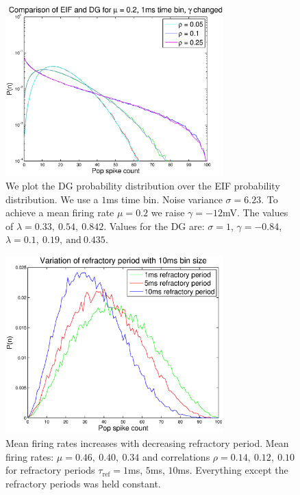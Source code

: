 \documentclass[11pt]{article}
\begin{document}
\begin{figure}[H]
\centering
\includegraphics[width=0.75\textwidth]{../Figures/EIF/DG_EIF_Macke_2a_mu_02_1ms_semilog}
\caption{\footnotesize We plot the DG probability distribution over the EIF probability distribution. We use a $1$ms time bin. Noise variance $\sigma = 6.23$. To achieve  a mean firing rate $\mu = 0.2$ we raise $\gamma =-12$mV. The values of $\lambda = 0.33,~0.54,~0.842$. Values for the DG are: $\sigma = 1$, $\gamma = -0.84$, $\lambda = 0.1,~0.19,~\text{and}~0.435$.}\label{figdgeif}
\end{figure}

\begin{figure}[H]
\centering
\includegraphics[width=0.75\textwidth]{../Figures/EIF/Refractory_period_10ms_bin}
\caption{\footnotesize Mean firing rates increases with decreasing refractory period. Mean firing rates: $\mu = 0.46,~0.40,~0.34$ and correlations $\rho = 0.14,~0.12,~0.10$ for refractory periods $\tau_\text{ref} = 1$ms, $5$ms, $10$ms. Everything except the refractory periods was held constant.}
\label{figdgeif}
\end{figure}
\end{document}
